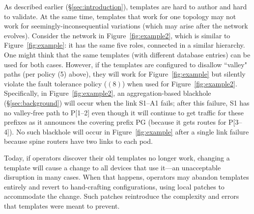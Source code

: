 \documentclass[numbers, 10pt, preprint]{sigplanconf}
\begin{document}

As described earlier (\S\ref{sec:introduction}), templates are hard to author and hard to validate. At the same time, templates that work for one topology may not work for seemingly-inconsequential variations (which may arise after the network evolves).
Consider the network in Figure~\ref{fig:example2}, which is similar to Figure~\ref{fig:example}: it has the same five roles, connected in a similar hierarchy. One might think that the same templates (with different database entries) can be used for both cases. However, if the templates are configured to disallow ``valley" paths (per policy (5) above), they will work for Figure~\ref{fig:example} but silently violate the fault tolerance policy ($(8)$) when used for Figure~\ref{fig:example2}.  Specifically, in Figure~\ref{fig:example2}, an aggregation-based blackhole (\S\ref{sec:background}) will occur when the link S1--A1 fails; after this failure, S1 has no valley-free path to P[1--2] even though it will continue to get traffic for these prefixes as it announces the covering prefix PG (because it gets routes for P[3--4]). No such blackhole will occur in Figure~\ref{fig:example} after a single link failure because spine routers have two links to each pod.


Today, if operators discover their old templates no longer work, changing a template will
cause a change to all devices that use it---an unacceptable disruption in many cases.  When that happens, operators may abandon templates entirely and revert to hand-crafting configurations, using local patches to accommodate the change.
Such patches reintroduce the complexity and errors that templates were meant to prevent.
\end{document}

